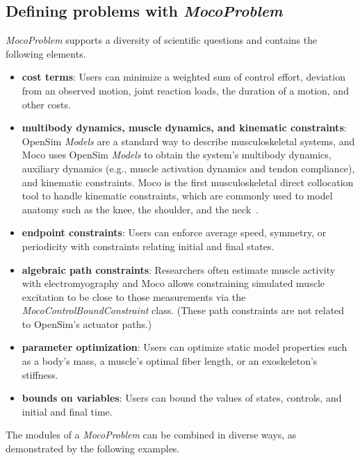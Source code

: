 \documentclass[10pt,letterpaper]{article}
\begin{document}
\subsection*{Defining problems with \textit{MocoProblem}}

\textit{MocoProblem} supports a diversity of scientific questions and contains the following elements.
\begin{itemize}
\item \textbf{cost terms}: Users can minimize a weighted sum of control effort, deviation from an observed motion, joint reaction loads, the duration of a motion, and other costs.
\item \textbf{multibody dynamics, muscle dynamics, and kinematic constraints}: OpenSim \textit{Models} are a standard way to describe musculoskeletal systems, and Moco uses OpenSim \textit{Models} to obtain the system’s multibody dynamics, auxiliary dynamics (e.g., muscle activation dynamics and tendon compliance), and kinematic constraints. Moco is the first musculoskeletal direct collocation tool to handle kinematic constraints, which are commonly used to model anatomy such as the knee, the shoulder, and the neck~\cite{Seth:2016,Lerner:2015,Rajagopal:2016ek,Cazzola:2017}.
\item \textbf{endpoint constraints}: Users can enforce average speed, symmetry, or periodicity with constraints relating initial and final states.
\item \textbf{algebraic path constraints}: Researchers often estimate muscle activity with electromyography and Moco allows constraining simulated muscle excitation to be close to those measurements via the \textit{MocoControlBoundConstraint} class. (These path constraints are not related to OpenSim’s actuator paths.)
\item \textbf{parameter optimization}: Users can optimize static model properties such as a body’s mass, a muscle’s optimal fiber length, or an exoskeleton’s stiffness.
\item \textbf{bounds on variables}: Users can bound the values of states, controls, and initial and final time.
\end{itemize}
The modules of a \textit{MocoProblem} can be combined in diverse ways, as demonstrated by the following examples.
\end{document}
